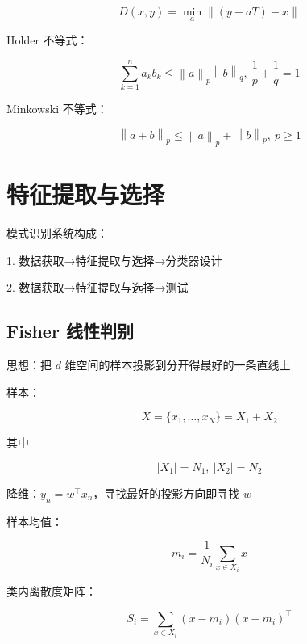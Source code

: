 \documentclass[openany,a4paper,12pt]{ctexbook}
\theoremstyle{kaiti}
\theoremstyle{normal}
\begin{document}
\begin{equation}
D\left(x,y \right)=\min_a\left\| \left(y+aT \right)-x \right\|
\end{equation}

Holder 不等式：

\begin{equation}
\sum_{k=1}^{n}a_kb_k\leqslant \left\| a \right\|_p\left\| b \right\|_q,~\frac{1}{p}+\frac{1}{q}=1
\end{equation}

Minkowski 不等式：

\begin{equation}
\left\| a+b \right\|_p\leqslant \left\| a \right\|_p+\left\| b \right\|_p,~p\geqslant 1
\end{equation}

\chapter{特征提取与选择}

模式识别系统构成：

1. 数据获取→特征提取与选择→分类器设计

2. 数据获取→特征提取与选择→测试

\section{Fisher 线性判别}

思想：把 $d$ 维空间的样本投影到分开得最好的一条直线上

样本：

\begin{equation}
X=\{ x_1,\dots,x_N\} =X_1+X_2
\end{equation}

其中

\begin{equation}
|X_1|=N_1,~|X_2|=N_2
\end{equation}

降维：$y_n=w^{\top}x_n$，寻找最好的投影方向即寻找 $w$

样本均值：

\begin{equation}
m_i=\frac{1}{N_i}\sum_{x\in X_i}x
\end{equation}

类内离散度矩阵：

\begin{equation}
S_i=\sum_{x\in X_i}\left(x-m_i \right)\left(x-m_i \right)^{\top}
\end{equation}
\end{document}
